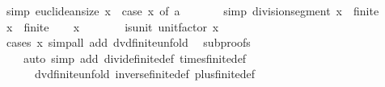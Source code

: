 \begin{isabellebody}
\isamarkupfalse%
\ {\isacharbrackleft}{\kern0pt}simp{\isacharbrackright}{\kern0pt}{\isacharcolon}{\kern0pt}\ {\isachardoublequoteopen}euclidean{\isacharunderscore}{\kern0pt}size\ x\ {\isacharequal}{\kern0pt}\ {\isacharparenleft}{\kern0pt}case\ x\ of\ a\ {\isasymRightarrow}\ {}\ {\isacharbar}{\kern0pt}\ {\isacharunderscore}{\kern0pt}\ {\isasymRightarrow}\ {}{\isacharparenright}{\kern0pt}{\isachardoublequoteclose}\isanewline
{}\isamarkupfalse%
\ {\isacharbrackleft}{\kern0pt}simp{\isacharbrackright}{\kern0pt}{\isacharcolon}{\kern0pt}\ {\isachardoublequoteopen}division{\isacharunderscore}{\kern0pt}segment\ {\isacharparenleft}{\kern0pt}x\ {\isacharcolon}{\kern0pt}{\isacharcolon}{\kern0pt}\ finite{\isacharunderscore}{\kern0pt}{}{\isacharparenright}{\kern0pt}\ {\isacharequal}{\kern0pt}\ {}{\isachardoublequoteclose}\isanewline
{}\isamarkupfalse%
\isanewline
%
\isadelimproof
%
\endisadelimproof
%
\isatagproof
{}\isamarkupfalse%
\isanewline
\ \ \isamarkupfalse%
\ x\ {\isacharcolon}{\kern0pt}{\isacharcolon}{\kern0pt}\ finite{\isacharunderscore}{\kern0pt}{}\isanewline
\ \ \isamarkupfalse%
\ {\isachardoublequoteopen}x\ {\isasymnoteq}\ {}{\isachardoublequoteclose}\isanewline
\ \ \isamarkupfalse%
\ \isamarkupfalse%
\ {\isachardoublequoteopen}is{\isacharunderscore}{\kern0pt}unit\ {\isacharparenleft}{\kern0pt}unit{\isacharunderscore}{\kern0pt}factor\ x{\isacharparenright}{\kern0pt}{\isachardoublequoteclose}\isanewline
\ \ \ \ \isamarkupfalse%
\ {\isacharparenleft}{\kern0pt}cases\ x{\isacharparenright}{\kern0pt}\ {\isacharparenleft}{\kern0pt}simp{\isacharunderscore}{\kern0pt}all\ add{\isacharcolon}{\kern0pt}\ dvd{\isacharunderscore}{\kern0pt}finite{\isacharunderscore}{\kern0pt}{}{\isacharunderscore}{\kern0pt}unfold{\isacharparenright}{\kern0pt}\isanewline
{}\isamarkupfalse%
\isanewline
\ \ {\isacharparenleft}{\kern0pt}subproofs\isanewline
\ \ \ \ {\isacartoucheopen}auto\ simp\ add{\isacharcolon}{\kern0pt}\ divide{\isacharunderscore}{\kern0pt}finite{\isacharunderscore}{\kern0pt}{}{\isacharunderscore}{\kern0pt}def\ times{\isacharunderscore}{\kern0pt}finite{\isacharunderscore}{\kern0pt}{}{\isacharunderscore}{\kern0pt}def\isanewline
\ \ \ \ \ \ dvd{\isacharunderscore}{\kern0pt}finite{\isacharunderscore}{\kern0pt}{}{\isacharunderscore}{\kern0pt}unfold\ inverse{\isacharunderscore}{\kern0pt}finite{\isacharunderscore}{\kern0pt}{}{\isacharunderscore}{\kern0pt}def\ plus{\isacharunderscore}{\kern0pt}finite{\isacharunderscore}{\kern0pt}{}{\isacharunderscore}{\kern0pt}def\isanewline

\end{isabellebody}
